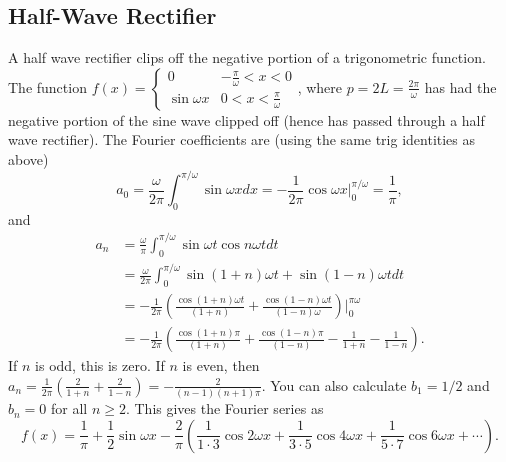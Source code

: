 \subsection{Half-Wave Rectifier}
A half wave rectifier clips off the negative portion of a trigonometric function. The function $f(x) = \begin{cases}0&-\frac{\pi}{\omega}<x<0\\ \sin\omega x &0< x<\frac{\pi}{\omega}\end{cases}$, where $p = 2L = \frac{2\pi}{\omega}$ has had the negative portion of the sine wave clipped off (hence has passed through a half wave rectifier).  The Fourier coefficients are (using the same trig identities as above) 
$$a_0=\frac{\omega}{2\pi}\int_0^{\pi/\omega}\sin\omega x dx = -\frac{1}{2\pi}\cos\omega x \big|_0^{\pi/\omega} = \frac{1}{\pi},$$ and 
\begin{align*}
a_n 
&= \frac{\omega}{\pi}\int_{0}^{\pi/\omega}\sin \omega t \cos n\omega tdt \\
&= \frac{\omega}{2\pi}\int_{0}^{\pi/\omega}\sin(1+n)\omega t+ \sin(1-n)\omega t dt \\
&= -\frac{1}{2\pi}\left(\frac{\cos(1+n)\omega t}{(1+n)}+ \frac{\cos(1-n)\omega t}{(1-n)\omega} \right)\big|_{0}^{\pi\omega} \\
&= -\frac{1}{2\pi}\left(\frac{\cos(1+n)\pi}{(1+n)}+ \frac{\cos(1-n)\pi}{(1-n)}  - \frac{1}{1+n}-\frac{1}{1-n}\right). 
\end{align*}
If $n$ is odd, this is zero.  If $n$ is even, then $a_n = \frac{1}{2\pi}\left( \frac{2}{1+n}+\frac{2}{1-n}\right) = -\frac{2}{(n-1)(n+1)\pi}$.  You can also calculate $b_1=1/2$ and $b_n=0$ for all $n\geq 2$.  This gives the Fourier series as
$$f(x) = \frac{1}{\pi}+\frac{1}{2}\sin\omega x  - \frac{2}{\pi}\left(\frac{1}{1\cdot 3}\cos 2\omega x + \frac{1}{3\cdot 5}\cos 4\omega x +\frac{1}{5\cdot 7}\cos 6\omega x +\cdots \right).$$



